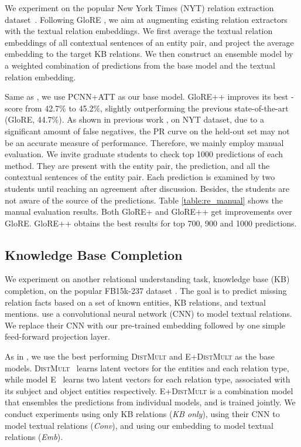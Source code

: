 \documentclass[11pt,a4paper]{article}
\begin{document}
We experiment on the popular New York Times (NYT) relation extraction dataset~\cite{riedel2010modeling}. 
Following GloRE \cite{su2017global}, 
we aim at augmenting existing relation extractors with the textual relation embeddings. 
We first average the textual relation embeddings of all contextual sentences of an entity pair, and project the average embedding to the target KB relations. We then construct an ensemble model by a weighted combination of predictions from the base model and the textual relation embedding. 

Same as \cite{su2017global}, we use PCNN+ATT \cite{lin2016neural} as our base model. GloRE++ improves its best -score from 42.7\% to 45.2\%, slightly outperforming the previous state-of-the-art (GloRE, 44.7\%). 
As shown in previous work \cite{su2017global}, on NYT dataset, due to a significant amount of false negatives, the PR curve on the held-out set may not be an accurate measure of performance. Therefore, we mainly employ manual evaluation. We invite graduate students to check top 1000 predictions of each method. They are present with the entity pair, the prediction, and all the contextual sentences of the entity pair. Each prediction is examined by two students until reaching an agreement after discussion. Besides, the students are not aware of the source of the predictions. 
Table \ref{table:re_manual} shows the manual evaluation results. Both GloRE+ and GloRE++ get improvements over GloRE. GloRE++ obtains the best results for top 700, 900 and 1000 predictions.
\subsection{Knowledge Base Completion}
\label{sec:kbc}
We experiment on another relational understanding task, knowledge base (KB) completion, on the popular FB15k-237 dataset \cite{toutanova2015representing}. The goal is to predict missing relation facts based on a set of known entities, KB relations, and textual mentions. 
\cite{toutanova2015representing} use a convolutional neural network (CNN) to model textual relations. We replace their CNN with our pre-trained embedding followed by one simple feed-forward projection layer.

As in \cite{toutanova2015representing}, we use the best performing \textsc{DistMult} and \textsc{E+DistMult} as the base models. \textsc{DistMult}~\cite{yang2014embedding} learns latent vectors for the entities and each relation type, while model \textsc{E}~\cite{riedel2013relation} learns two latent vectors for each relation type, associated with its subject and object entities respectively. \textsc{E+DistMult} is a combination model that ensembles the predictions from individual models, and is trained jointly. We conduct experiments using only KB relations (\emph{KB only}), using their CNN to model textual relations (\emph{Conv}), and using our embedding to model textual relations (\emph{Emb}). 
\end{document}
